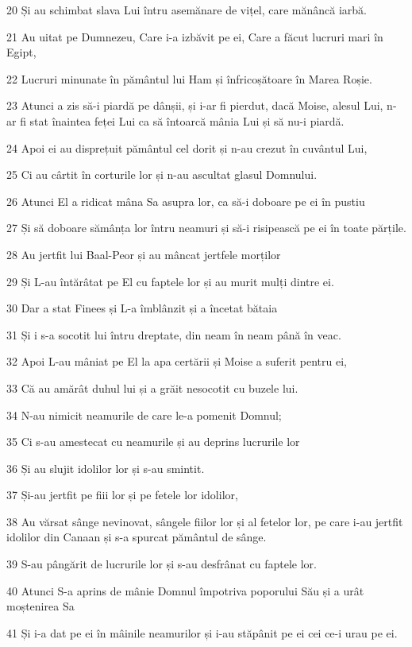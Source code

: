 \par 20 Și au schimbat slava Lui întru asemănare de vițel, care mănâncă iarbă.
\par 21 Au uitat pe Dumnezeu, Care i-a izbăvit pe ei, Care a făcut lucruri mari în Egipt,
\par 22 Lucruri minunate în pământul lui Ham și înfricoșătoare în Marea Roșie.
\par 23 Atunci a zis să-i piardă pe dânșii, și i-ar fi pierdut, dacă Moise, alesul Lui, n-ar fi stat înaintea feței Lui ca să întoarcă mânia Lui și să nu-i piardă.
\par 24 Apoi ei au disprețuit pământul cel dorit și n-au crezut în cuvântul Lui,
\par 25 Ci au cârtit în corturile lor și n-au ascultat glasul Domnului.
\par 26 Atunci El a ridicat mâna Sa asupra lor, ca să-i doboare pe ei în pustiu
\par 27 Și să doboare sămânța lor întru neamuri și să-i risipească pe ei în toate părțile.
\par 28 Au jertfit lui Baal-Peor și au mâncat jertfele morților
\par 29 Și L-au întărâtat pe El cu faptele lor și au murit mulți dintre ei.
\par 30 Dar a stat Finees și L-a îmblânzit și a încetat bătaia
\par 31 Și i s-a socotit lui întru dreptate, din neam în neam până în veac.
\par 32 Apoi L-au mâniat pe El la apa certării și Moise a suferit pentru ei,
\par 33 Că au amărât duhul lui și a grăit nesocotit cu buzele lui.
\par 34 N-au nimicit neamurile de care le-a pomenit Domnul;
\par 35 Ci s-au amestecat cu neamurile și au deprins lucrurile lor
\par 36 Și au slujit idolilor lor și s-au smintit.
\par 37 Și-au jertfit pe fiii lor și pe fetele lor idolilor,
\par 38 Au vărsat sânge nevinovat, sângele fiilor lor și al fetelor lor, pe care i-au jertfit idolilor din Canaan și s-a spurcat pământul de sânge.
\par 39 S-au pângărit de lucrurile lor și s-au desfrânat cu faptele lor.
\par 40 Atunci S-a aprins de mânie Domnul împotriva poporului Său și a urât moștenirea Sa
\par 41 Și i-a dat pe ei în mâinile neamurilor și i-au stăpânit pe ei cei ce-i urau pe ei.
